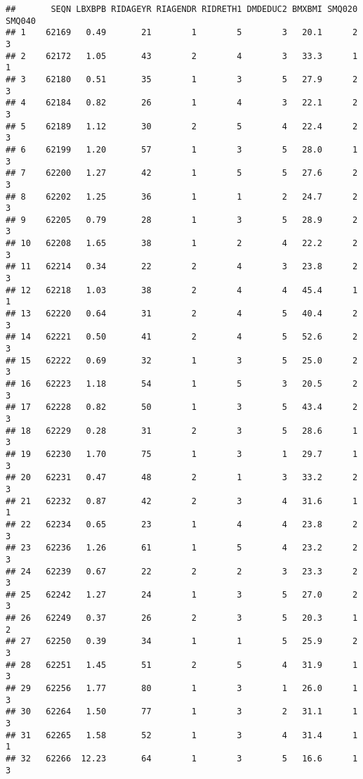 \documentclass[
]{article}
\begin{document}
\begin{verbatim}
##       SEQN LBXBPB RIDAGEYR RIAGENDR RIDRETH1 DMDEDUC2 BMXBMI SMQ020 SMQ040
## 1    62169   0.49       21        1        5        3   20.1      2      3
## 2    62172   1.05       43        2        4        3   33.3      1      1
## 3    62180   0.51       35        1        3        5   27.9      2      3
## 4    62184   0.82       26        1        4        3   22.1      2      3
## 5    62189   1.12       30        2        5        4   22.4      2      3
## 6    62199   1.20       57        1        3        5   28.0      1      3
## 7    62200   1.27       42        1        5        5   27.6      2      3
## 8    62202   1.25       36        1        1        2   24.7      2      3
## 9    62205   0.79       28        1        3        5   28.9      2      3
## 10   62208   1.65       38        1        2        4   22.2      2      3
## 11   62214   0.34       22        2        4        3   23.8      2      3
## 12   62218   1.03       38        2        4        4   45.4      1      1
## 13   62220   0.64       31        2        4        5   40.4      2      3
## 14   62221   0.50       41        2        4        5   52.6      2      3
## 15   62222   0.69       32        1        3        5   25.0      2      3
## 16   62223   1.18       54        1        5        3   20.5      2      3
## 17   62228   0.82       50        1        3        5   43.4      2      3
## 18   62229   0.28       31        2        3        5   28.6      1      3
## 19   62230   1.70       75        1        3        1   29.7      1      3
## 20   62231   0.47       48        2        1        3   33.2      2      3
## 21   62232   0.87       42        2        3        4   31.6      1      1
## 22   62234   0.65       23        1        4        4   23.8      2      3
## 23   62236   1.26       61        1        5        4   23.2      2      3
## 24   62239   0.67       22        2        2        3   23.3      2      3
## 25   62242   1.27       24        1        3        5   27.0      2      3
## 26   62249   0.37       26        2        3        5   20.3      1      2
## 27   62250   0.39       34        1        1        5   25.9      2      3
## 28   62251   1.45       51        2        5        4   31.9      1      3
## 29   62256   1.77       80        1        3        1   26.0      1      3
## 30   62264   1.50       77        1        3        2   31.1      1      3
## 31   62265   1.58       52        1        3        4   31.4      1      1
## 32   62266  12.23       64        1        3        5   16.6      1      3

\end{verbatim}
\end{document}
